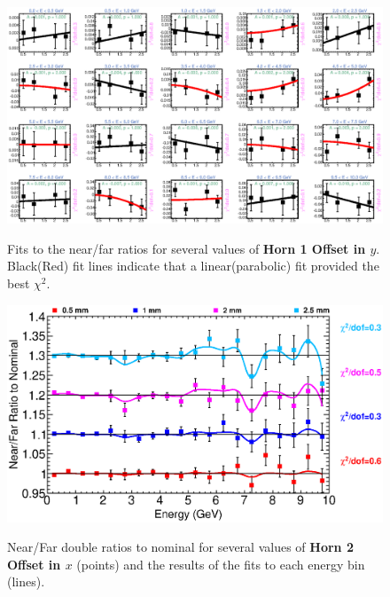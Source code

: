 {\begin{figure}[ht]
  \begin{center}
    {\includegraphics[width=5.0in]{figures/Horn1YOffset_nof_fits.eps}}
  \end{center}
\caption{ Fits to the near/far ratios for several values of {\bf Horn 1 Offset in $y$}. Black(Red) fit lines indicate that a linear(parabolic) fit provided the best $\chi^2$. }
\end{figure}

\begin{figure}[ht]
  \begin{center}
    {\includegraphics[width=6.0in]{figures/Horn2XOffset_nof_summary.eps}}
  \end{center}
\caption{ Near/Far double ratios to nominal for several values of {\bf Horn 2 Offset in $x$} (points) and the results of the fits to each energy bin (lines).}
\end{figure}

}
